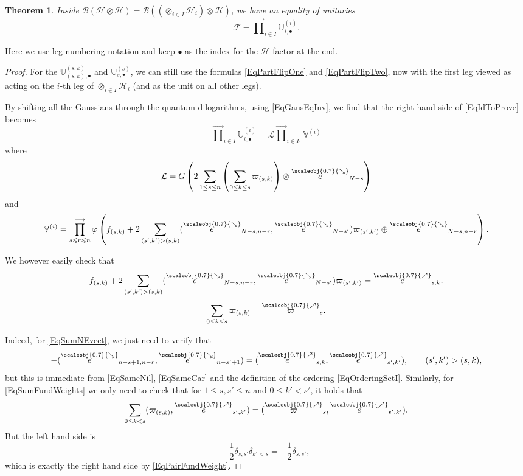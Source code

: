 \documentclass[11pt, reqno]{amsart}
\newtheorem{theorem}{Theorem}[section]
\theoremstyle{definition}
\numberwithin{equation}{section}
\def\longra{\longrightarrow}
\newcommand{\hr}[1]{\left(#1\right)}                                                    %
\def\le{\leqslant}
\def\Hc{\mathcal H}
\newcommand{\Hsp}{\mathcal{H}}
\newcommand{\Bc}{\mathcal{B}}
\newcommand{\Gauss}{G}
\newcommand{\bbU}{\mathbb{U}}
\newcommand{\bbV}{\mathbb{V}}
\newcommand{\Fct}{\mathcal{F}}
\newcommand{\nears}{\scaleobj{0.7}{\nearrow}}
\newcommand{\sears}{\scaleobj{0.7}{\searrow}}
\newcommand{\nee}{\overset{\nears}{e}}
\newcommand{\seee}{\overset{\sears}{e}}
\newcommand{\nevarpi}{\overset{\nears}{\varpi}}
\newcommand{\Lc}{\mathcal{L}}
\begin{document}
\begin{theorem}\label{TheoProdFG}
Inside $\Bc(\Hsp \otimes \Hsp) = \Bc\left(\left(\otimes_{i\in I} \Hc_i\right) \otimes \Hsp\right)$, we have an equality of unitaries
\begin{equation}\label{EqIdToProve}
\Fct = \overset{\longra}{\prod}_{i\in I} \bbU^{(i)}_{i,\bullet}. 
\end{equation}
\end{theorem}
Here we use leg numbering notation and keep $\bullet$ as the index for the $\Hsp$-factor at the end.
\begin{proof}
For the $\bbU^{(s,k)}_{(s,k),\bullet}$ and $\bbU^{(s)}_{s,\bullet}$,  we can still use the formulas \eqref{EqPartFlipOne} and \eqref{EqPartFlipTwo}, now with the first leg viewed as acting on the $i$-th leg of $\otimes_{i\in I} \Hc_i$ (and as the unit on all other legs). 

By shifting all the Gaussians through the quantum dilogarithms, using \eqref{EqGausEqInv}, we find that the right hand side of \eqref{EqIdToProve} becomes
\[
\overset{\rightarrow}{\prod}_{i\in I} \bbU^{(i)}_{i,\bullet} = \Lc \overset{\rightarrow}{\prod}_{i\in I_1} \bbV^{(i)}
\]
where 
\begin{equation}\label{EqGausPart}
\Lc = \Gauss\left(2\sum_{1\leq s \leq n}\left(\sum_{0\leq k \leq s} \varpi_{(s,k)} \right)\otimes \seee_{N-s}\right)
\end{equation}
and 
\begin{equation}\label{EqqDilogPart}
\bbV^{(i)} = \prod_{s \le r \le n}^{\longra}   \varphi\hr{f_{(s,k)}+ 2\sum_{(s',k')>(s,k)}(\seee_{N-s,n-r},\seee_{N-s'})\varpi_{(s',k')} \oplus \seee_{N-s,n-r}}.
\end{equation}

We however easily check that 
\begin{equation}\label{EqSumNEvect}
f_{(s,k)}+ 2\sum_{(s',k')>(s,k)}(\seee_{N-s,n-r},\seee_{N-s'})\varpi_{(s',k')} = \nee_{s,k}.
\end{equation}
\begin{equation}\label{EqSumFundWeights}
\sum_{0\leq k \leq s} \varpi_{(s,k)} = \nevarpi_s.
\end{equation}

Indeed, for \eqref{EqSumNEvect}, we just need to verify that 
\[
-(\seee_{n-s+1,n-r},\seee_{n-s'+1}) = (\nee_{s,k},\nee_{s',k'}),\qquad (s',k')>(s,k),
\]
but this is immediate from \eqref{EqSameNil}, \eqref{EqSameCar} and the definition of the ordering \eqref{EqOrderingSetI}. Similarly, for \eqref{EqSumFundWeights} we only need to check that for $1\leq s,s' \leq n$ and $0\leq k' < s'$, it holds that
\[
\sum_{0\leq k< s} (\varpi_{(s,k)},\nee_{s',k'}) =  (\nevarpi_s,\nee_{s',k'}).
\]
But the left hand side is 
\[
-\frac{1}{2}\delta_{s,s'} \delta_{k'<s} =  -\frac{1}{2}\delta_{s,s'},
\]
which is exactly the right hand side by \eqref{EqPairFundWeight}.


\end{proof}
\end{document}
